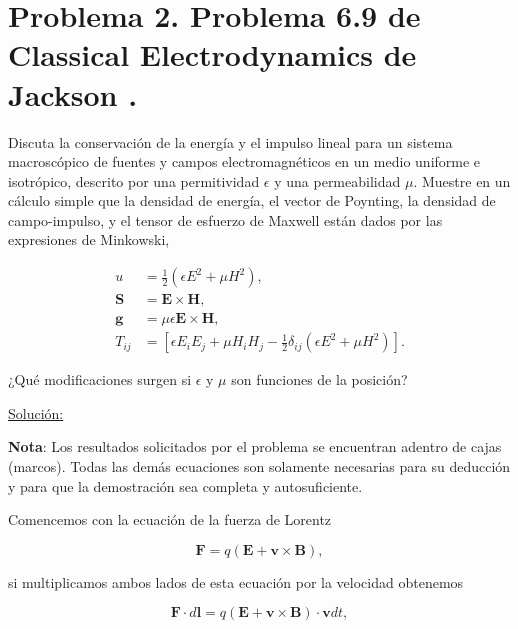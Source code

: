 \documentclass[a4paper,11pt]{article}
\numberwithin{equation}{section}
\begin{document}
\newpage

\section{Problema 2. Problema 6.9 de Classical Electrodynamics
de Jackson \cite{jackson}.}

Discuta la conservación de la energía y el impulso lineal para un sistema macroscópico 
de fuentes y campos electromagnéticos en un medio uniforme e isotrópico, descrito 
por una permitividad $\epsilon$ y una permeabilidad $\mu$. Muestre en un cálculo 
simple que la densidad de energía, el vector de Poynting, la densidad de campo-impulso, 
y el tensor de esfuerzo de Maxwell están dados por las expresiones de Minkowski,

\begin{align*}
u &= \frac{1}{2}(\epsilon E^2 + \mu H^2), \\
\mathbf{S} &= \mathbf{E} \times \mathbf{H}, \\
\mathbf{g} &= \mu\epsilon \mathbf{E} \times \mathbf{H}, \\
T_{ij} &= [\epsilon E_iE_j + \mu H_iH_j - \frac{1}{2}\delta_{ij}(\epsilon E^2 + \mu H^2)].
\end{align*}

¿Qué modificaciones surgen si $\epsilon$ y $\mu$ son funciones de la posición?

\vspace{.3cm}

\underline{Solución:} \vspace{.3cm}

\begin{mdframed}[linewidth=2]
\textbf{Nota}: Los resultados solicitados por el problema se encuentran adentro 
de cajas (marcos). Todas las demás ecuaciones son solamente necesarias para 
su deducción y para que la demostración sea completa y autosuficiente.
\end{mdframed}

Comencemos con la ecuación de la fuerza de Lorentz 

\begin{equation}
 \mathbf{F} = q(\mathbf{E} + \mathbf{v} \times \mathbf{B}),
\end{equation}

si multiplicamos ambos lados de esta ecuación por la velocidad obtenemos 

\begin{equation}
 \mathbf{F}\cdot d\mathbf{l} = q(\mathbf{E} + \mathbf{v} \times \mathbf{B})\cdot 
 \mathbf{v}dt,
\end{equation}
\end{document}
